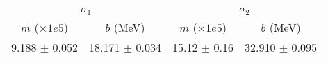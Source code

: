 \begin{tabular}{cc|cc}
\multicolumn{2}{c|}{$\sigma_1$} & \multicolumn{2}{|c}{$\sigma_2$} \\
$m$ ($\times1e5$) & $b$ (MeV) & $m$ ($\times1e5$) & $b$ (MeV) \\
\hline
9.188 $\pm$ 0.052 & 18.171 $\pm$ 0.034 & 15.12 $\pm$ 0.16 & 32.910 $\pm$ 0.095\\
\end{tabular}
